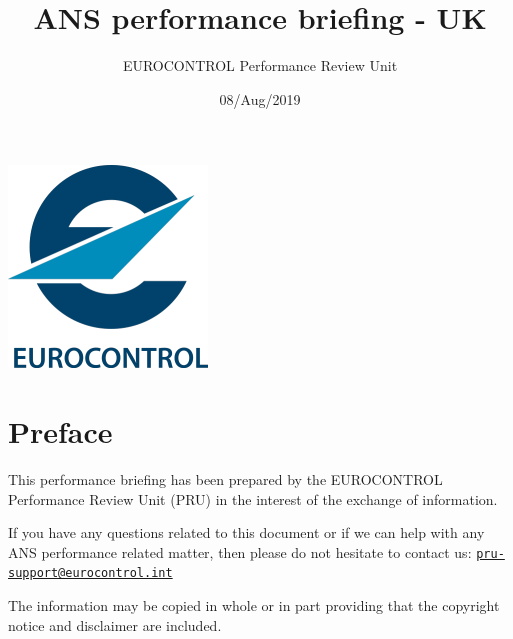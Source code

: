 \documentclass[]{article}
\title{ANS performance briefing - UK}
\author{EUROCONTROL Performance Review Unit}
\date{08/Aug/2019}
\begin{document}
\maketitle

\begin{center}\includegraphics[width=\textwidth]{images/logo} \end{center}

\newpage

\hypertarget{preface}{%
\section*{Preface}\label{preface}}

This performance briefing has been prepared by the EUROCONTROL Performance Review Unit (PRU) in the interest of the exchange of information.

If you have any questions related to this document or if we can help with any ANS performance related matter, then please do not hesitate to contact us: \href{mailto:pru-support@eurocontrol.int}{\nolinkurl{pru-support@eurocontrol.int}}

The information may be copied in whole or in part providing that the copyright notice and disclaimer are included.
\end{document}
